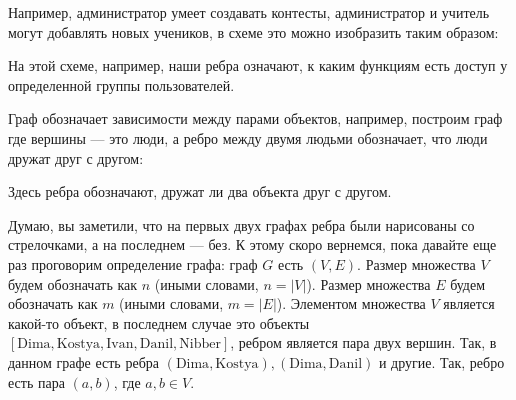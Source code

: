 \documentclass{article}
\begin{document}
Например, администратор умеет создавать контесты, администратор и учитель могут добавлять новых учеников, в схеме это можно изобразить таким образом:

\begin{center}

На этой схеме, например, наши ребра означают, к каким функциям есть доступ у определенной группы пользователей. 
\end{center}

Граф обозначает зависимости между парами объектов, например, построим граф где вершины --- это люди, а ребро между двумя людьми обозначает, что люди дружат друг с другом:

\begin{center}

Здесь ребра обозначают, дружат ли два объекта друг с другом. 
\end{center}

Думаю, вы заметили, что на первых двух графах ребра были нарисованы со стрелочками, а на последнем --- без. К этому скоро вернемся, пока давайте еще раз проговорим определение графа: граф $G$ есть $(V,E)$. Размер множества $V$ будем обозначать как $n$ (иными словами, $n = |V|$). Размер множества $E$ будем обозначать как $m$ (иными словами, $m = |E|$). Элементом множества $V$ является какой-то объект, в последнем случае это объекты $[\text{Dima},\text{Kostya},
\text{Ivan},\text{Danil},\text{Nibber}]$, ребром является пара двух вершин. Так, в данном графе есть ребра $(\text{Dima}, \text{Kostya}), (\text{Dima}, \text{Danil})$ и другие. Так, ребро есть пара $(a,b)$, где $a,b \in V$. 
\end{document}
